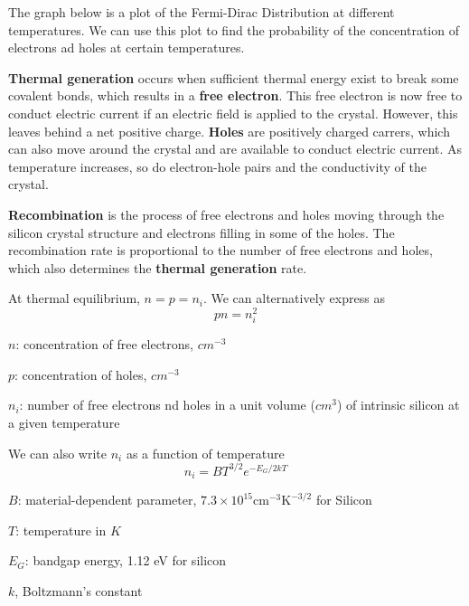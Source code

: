 The graph below is a plot of the Fermi-Dirac Distribution at different temperatures. We can use this plot to find the probability of the concentration of electrons ad holes at certain temperatures.


\textbf{Thermal generation} occurs when sufficient thermal energy exist to break some covalent bonds, which results in a \textbf{free electron}. This free electron is now free to conduct electric current if an electric field is applied to the crystal. However, this leaves behind a net positive charge. \textbf{Holes} are positively charged carrers, which can also move around the crystal and are available to conduct electric current. As temperature increases, so do electron-hole pairs and the conductivity of the crystal. 

\textbf{Recombination} is the process of free electrons and  holes moving through the silicon crystal structure and electrons filling in some of the holes. The recombination rate is proportional to the number of free electrons and holes, which also determines the \textbf{thermal generation} rate.

At thermal equilibrium, $n = p = n_i$. We can alternatively express as
\[pn = n_i^2\]
\begin{gline}
    \item $n$: concentration of free electrons, $cm^{-3}$
    \item $p$: concentration of holes, $cm^{-3}$
    \item $n_i$: number of free electrons nd holes in a unit volume ($cm^3$) of intrinsic silicon at a given temperature
\end{gline}

We can also write $n_i$ as a function of temperature
\[n_i = BT^{3/2} e^{-E_G / 2kT}\]
\begin{gline}
    \item $B$: material-dependent parameter, $7.3 \times 10^{15} \text{cm}^{-3} \text{K}^{-3/2}$ for Silicon
    \item $T$: temperature in $K$
    \item $E_G$: bandgap energy, 1.12 eV for silicon
    \item $k$, Boltzmann's constant
\end{gline}

